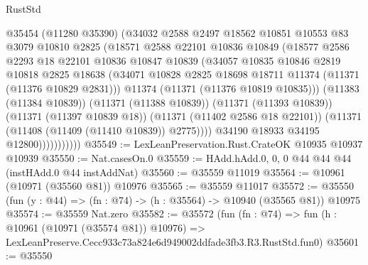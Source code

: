 \begin{lexlean}{RustStd}
\begin{coremodule}
                        @35454
                        (@11280 @35390)
                        (@34032
                          @2588
                          @2497
                          @18562
                          @10851
                          @10553
                          @83
                          @3079
                          @10810
                          @2825
                          (@18571
                            @2588
                            @22101
                            @10836
                            @10849
                            (@18577
                              @2586
                              @2293
                              @18
                              @22101
                              @10836
                              @10847
                              @10839
                              (@34057
                                @10835
                                @10846
                                @2819
                                @10818
                                @2825
                                @18638
                                (@34071
                                  @10828
                                  @2825
                                  @18698
                                  @18711
                                  @11374
                                  (@11371 (@11376 @10829 @2831)))
                                @11374
                                (@11371 (@11376 @10819 @10835)))
                              (@11383 (@11384 @10839))
                              (@11371 (@11388 @10839))
                              (@11371 (@11393 @10839))
                              (@11371 (@11397 @10839 @18))
                              (@11371 (@11402 @2586 @18 @22101))
                              (@11371 (@11408 (@11409 (@11410 @10839)) @2775))))
                          @34190
                          @18933
                          @34195
                          @12800)))))))))))
@35549 := LexLeanPreservation.Rust.CrateOK @10935 @10937 @10939
@35550 := Nat.casesOn.{0}
@35559 := HAdd.hAdd.{0, 0, 0} @44 @44 @44 (instHAdd.{0} @44 instAddNat)
@35560 := @35559 @11019
@35564 := @10961 (@10971 (@35560 @81)) @10976
@35565 := @35559 @11017
@35572 := @35550 (fun (y : @44) => (fn : @74) -> (h : @35564) -> @10940 (@35565 @81)) @10975
@35574 := @35559 Nat.zero
@35582 := @35572
    (fun (fn : @74) =>
    fun (h : @10961 (@10971 (@35574 @81)) @10976) =>
    LexLeanPreserve.Cecc933c73a824e6d949002ddfade3fb3.R3.RustStd.fun0)
@35601 := @35550

\end{coremodule}
\end{lexlean}
